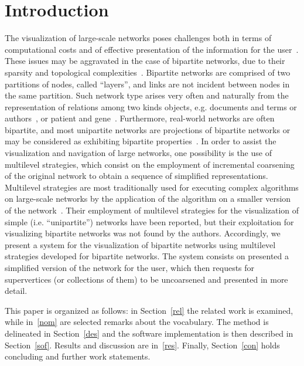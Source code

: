 \documentclass[runningheads]{llncs}
\begin{document}
\section{Introduction}
The visualization of large-scale networks poses challenges both in terms of computational costs
and of effective presentation of the information for the user~\cite{tang,staudt}.
These issues may be aggravated in the case of bipartite networks,
due to their sparsity and topological complexities~\cite{alan1}.
Bipartite networks are comprised of two partitions of nodes,
called ``layers'',
and links are not incident between nodes in the same partition.
Such network type arises very often and naturally from the representation
of relations among two kinds objects,
e.g. documents and terms or authors~\cite{doc,sci,movie}, or patient and gene~\cite{gene}.
Furthermore, real-world networks are often bipartite, and most unipartite networks
are projections of bipartite networks or may be considered as exhibiting bipartite properties~\cite{guillaume0,guillaume}.
In order to assist the visualization and navigation of large networks, one possibility is the use of
multilevel strategies, which consist on the employment of incremental coarsening of the original
network to obtain a sequence of simplified representations.
Multilevel strategies are most traditionally used for executing complex algorithms
on large-scale networks by the application of the algorithm on a smaller
version of the network~\cite{alan2,ml2}.
Their employment of multilevel strategies for the visualization of simple (i.e. ``unipartite'')
networks have been reported, but their exploitation for visualizing bipartite networks
was not found by the authors.
Accordingly, we present a system for the visualization of bipartite networks using
multilevel strategies developed for bipartite networks.
The system consists on presented a simplified version of the network for the user, which then
requests for supervertices (or collections of them) to be uncoarsened and presented in more detail.

This paper is organized as follows: in Section~\ref{rel} the related work is examined, while in~\ref{nom} are selected remarks about the vocabulary.
The method is delineated in Section~\ref{des} and
the software implementation is then described in Section~\ref{sof}.
Results and discussion are in~\ref{res}.
Finally, Section~\ref{con} holds concluding and further work statements.
\end{document}
